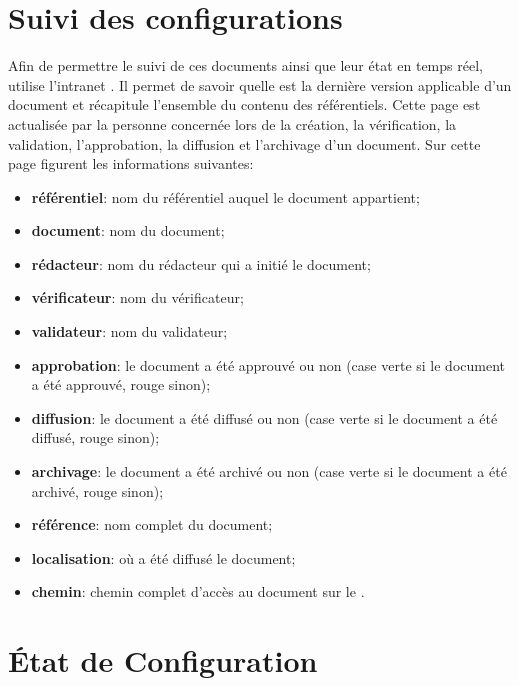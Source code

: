 \section{Suivi des configurations}

Afin de permettre le suivi de ces documents ainsi que leur état en temps réel, \nomEquipe{} utilise l'intranet \lintranet. 
Il permet de savoir quelle est la dernière version applicable d'un document et récapitule l'ensemble du contenu des référentiels. 
Cette page est actualisée par la personne concernée lors de la création, la vérification, la validation, l'approbation, la diffusion et l'archivage d'un document. Sur cette page figurent les informations suivantes:
\begin{itemize}
	\item \textbf{référentiel}: nom du référentiel auquel le document appartient;
	\item \textbf{document}: nom du document;
	\item \textbf{rédacteur}: nom du rédacteur qui a initié le document;
	\item \textbf{vérificateur}: nom du vérificateur;
	\item \textbf{validateur}: nom du validateur;
	\item \textbf{approbation}: le document a été approuvé ou non (case verte si le document a été
	approuvé, rouge sinon);
	\item \textbf{diffusion}: le document a été diffusé ou non (case verte si le document a été
	diffusé, rouge sinon);
	\item \textbf{archivage}: le document a été archivé ou non (case verte si le document a été
	archivé, rouge sinon);
	\item \textbf{référence}: nom complet du document;
	\item \textbf{localisation}: où a été diffusé le document;
	\item \textbf{chemin}: chemin complet d'accès au document sur le \git.
\end{itemize}


\section{État de Configuration}
\label{EC}

